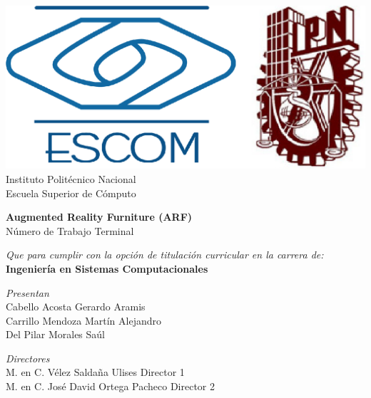 
\begin{titlepage}

    \centering %

    \includegraphics[scale=0.17]{imagenes/escom-ipn} %
    \LARGE{\\ Instituto Polit\'ecnico Nacional}
    \LARGE{\\ Escuela Superior de C\'omputo}
    
    \vspace{1cm} %

    \LARGE \textbf{Augmented Reality Furniture (ARF)}
    \LARGE {\\ Número de Trabajo Terminal}

    \vspace{1cm} %

    \LARGE \textit{Que para cumplir con la opción de titulación curricular en la carrera de:}
    \LARGE \textbf{\\ Ingeniería en Sistemas Computacionales}

    \vspace{1cm} %

   \textit{Presentan}\\
    Cabello Acosta Gerardo Aramis\\
    Carrillo Mendoza Martín Alejandro \\
    Del Pilar Morales Saúl

    \vspace{1cm} %

   \textit{Directores}\\
    M. en C. Vélez Saldaña Ulises \bigskip Director 1 \\
    M. en C. José David Ortega Pacheco \bigskip  Director 2
\end{titlepage}